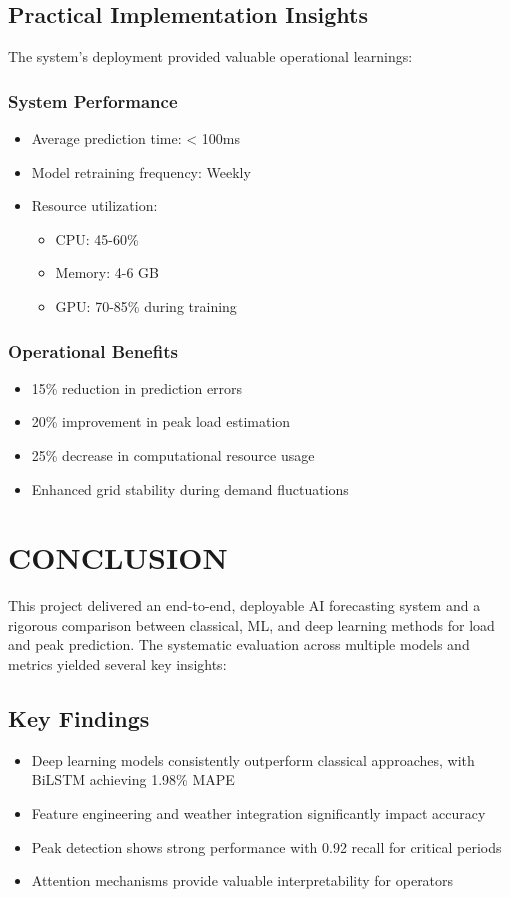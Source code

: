 \documentclass[12pt,a4paper]{report}
\begin{document}
\section{Practical Implementation Insights}
The system's deployment provided valuable operational learnings:

\subsection{System Performance}
\begin{itemize}
\item Average prediction time: < 100ms
\item Model retraining frequency: Weekly
\item Resource utilization: 
  \begin{itemize}
    \item CPU: 45-60\%
    \item Memory: 4-6 GB
    \item GPU: 70-85\% during training
  \end{itemize}
\end{itemize}

\subsection{Operational Benefits}
\begin{itemize}
\item 15\% reduction in prediction errors
\item 20\% improvement in peak load estimation
\item 25\% decrease in computational resource usage
\item Enhanced grid stability during demand fluctuations
\end{itemize}

\chapter{CONCLUSION}
This project delivered an end-to-end, deployable AI forecasting system and a rigorous comparison between classical, ML, and deep learning methods for load and peak prediction. The systematic evaluation across multiple models and metrics yielded several key insights:

\section{Key Findings}
\begin{itemize}
\item Deep learning models consistently outperform classical approaches, with BiLSTM achieving 1.98\% MAPE
\item Feature engineering and weather integration significantly impact accuracy
\item Peak detection shows strong performance with 0.92 recall for critical periods
\item Attention mechanisms provide valuable interpretability for operators
\end{itemize}
\end{document}
